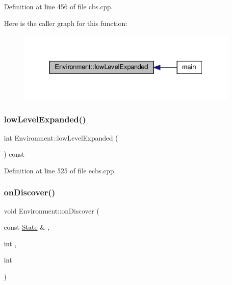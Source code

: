 Definition at line 456 of file cbs.\+cpp.

Here is the caller graph for this function\+:
\nopagebreak
\begin{figure}[H]
\begin{center}
\leavevmode
\includegraphics[width=313pt]{class_environment_af870f6d7c69f7401f5d724b0ee60308f_icgraph}
\end{center}
\end{figure}
\mbox{\label{class_environment_af870f6d7c69f7401f5d724b0ee60308f}} 
\subsubsection{\texorpdfstring{low\+Level\+Expanded()}{lowLevelExpanded()}\hspace{0.1cm}{\footnotesize\ttfamily [2/2]}}
{\footnotesize\ttfamily int Environment\+::low\+Level\+Expanded (\begin{DoxyParamCaption}{ }\end{DoxyParamCaption}) const\hspace{0.3cm}{\ttfamily [inline]}}



Definition at line 525 of file ecbs.\+cpp.

\mbox{\label{class_environment_a0c694f293bf62ef33dab4b878893bacf}} 
\subsubsection{\texorpdfstring{on\+Discover()}{onDiscover()}\hspace{0.1cm}{\footnotesize\ttfamily [1/2]}}
{\footnotesize\ttfamily void Environment\+::on\+Discover (\begin{DoxyParamCaption}\item[{const \hyperlink{struct_state}{State} \&}]{,  }\item[{int}]{,  }\item[{int}]{ }\end{DoxyParamCaption})\hspace{0.3cm}{\ttfamily [inline]}}



